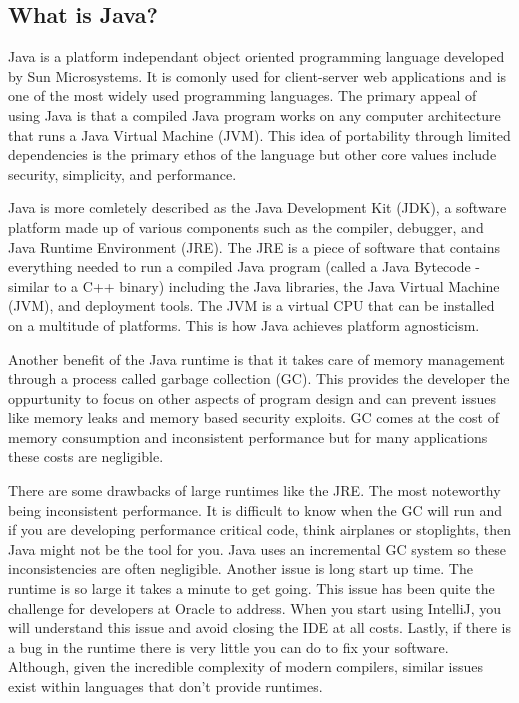 \documentclass[../../main.tex]{subfiles}
\begin{document}
\subsection{What is Java?}
Java is a platform independant object oriented programming language developed by Sun Microsystems.
It is comonly used for client-server web applications and is one of the most widely used
programming languages. The primary appeal of using Java is that a compiled Java program works on
any computer architecture that runs a Java Virtual Machine (JVM). This idea of portability through
limited dependencies is the primary ethos of the language but other core values include security,
simplicity, and performance.

\vspace{1em}
Java is more comletely described as the Java Development Kit (JDK), a software platform made up of
various components such as the compiler, debugger, and Java Runtime Environment (JRE). The JRE is
a piece of software that contains everything needed to run a compiled Java program (called a Java
Bytecode - similar to a C++ binary) including the Java libraries, the Java Virtual Machine (JVM),
and deployment tools. The JVM is a virtual CPU that can be installed on a multitude of platforms.
This is how Java achieves platform agnosticism.

\vspace{1em}
Another benefit of the Java runtime is that it takes care of memory management through a process
called garbage collection (GC). This provides the developer the oppurtunity to focus on other
aspects of program design and can prevent issues like memory leaks and memory based security
exploits. GC comes at the cost of memory consumption and inconsistent performance but for many
applications these costs are negligible.

\vspace{1em}
There are some drawbacks of large runtimes like the JRE. The most noteworthy being inconsistent
performance. It is difficult to know when the GC will run and if you are developing performance
critical code, think airplanes or stoplights, then Java might not be the tool for you. Java uses
an incremental GC system so these inconsistencies are often negligible. Another issue is long
start up time. The runtime is so large it takes a minute to get going. This issue has been quite
the challenge for developers at Oracle to address. When you start using IntelliJ, you will
understand this issue and avoid closing the IDE at all costs. Lastly, if there is a bug in the
runtime there is very little you can do to fix your software. Although, given the incredible
complexity of modern compilers, similar issues exist within languages that don't provide runtimes.
\end{document}
